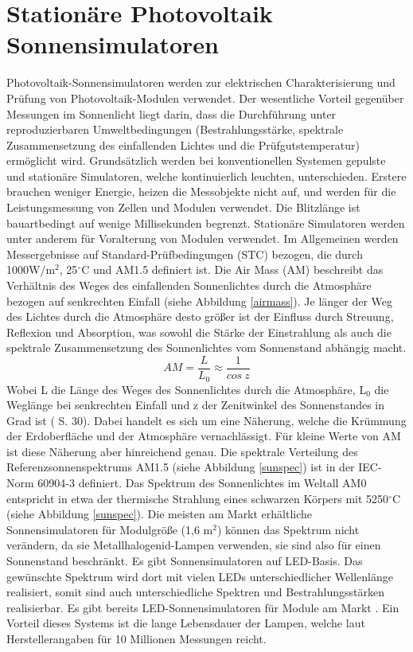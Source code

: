 \documentclass[a4paper,bibtotoc,oneside]{scrbook}
\begin{document}
\section{Stationäre Photovoltaik Sonnensimulatoren} \thispagestyle{empty}

Photovoltaik-Sonnensimulatoren werden zur elektrischen Charakterisierung und Prüfung von Photovoltaik-Modulen verwendet. Der wesentliche Vorteil gegenüber Messungen im Sonnenlicht liegt darin, dass die Durchführung unter reproduzierbaren Umweltbedingungen (Bestrahlungsstärke, spektrale Zusammensetzung des einfallenden Lichtes und die Prüfgutstemperatur)  ermöglicht wird. Grundsätzlich werden bei konventionellen Systemen gepulste und stationäre Simulatoren, welche kontinuierlich leuchten, unterschieden. Erstere brauchen weniger Energie, heizen die Messobjekte nicht auf, und werden für die Leistungsmessung von Zellen und Modulen verwendet. Die Blitzlänge ist bauartbedingt auf wenige Millisekunden begrenzt. Stationäre Simulatoren werden unter anderem für Voralterung von Modulen verwendet.
Im Allgemeinen werden Messergebnisse auf Standard-Prüfbedingungen (STC) bezogen, die durch 1000W/m$^2$, 25$^{\circ}$C und AM1.5 definiert ist. Die Air Mass (AM) beschreibt das Verhältnis des Weges des einfallenden Sonnenlichtes durch die Atmosphäre bezogen auf senkrechten Einfall (siehe Abbildung \ref{airmass}). Je länger der Weg des Lichtes durch die Atmosphäre desto größer ist der Einfluss durch Streuung, Reflexion und Absorption, was sowohl die Stärke der Einstrahlung als auch die spektrale Zusammensetzung des Sonnenlichtes vom Sonnenstand abhängig macht. 
\begin{equation}
     AM = \frac {L} {L_0} \approx \frac{1}{cos~ z}
\end{equation}
Wobei L die Länge des Weges des Sonnenlichtes durch die Atmosphäre, L$_0$ die Weglänge bei senkrechten Einfall und z der Zenitwinkel des Sonnenstandes in Grad ist (\cite{wurf} S. 30). Dabei handelt es sich um eine Näherung, welche die Krümmung der Erdoberfläche und der Atmosphäre vernachlässigt. Für kleine Werte von AM ist diese Näherung aber hinreichend genau.
Die spektrale Verteilung des Referenzsonnenspektrums AM1.5 (siehe Abbildung \ref{sunspec}) ist in der IEC-Norm 60904-3 \cite{norm3} definiert. Das Spektrum des Sonnenlichtes im Weltall AM0 entspricht in etwa der thermische Strahlung eines schwarzen Körpers mit 5250$^\circ$C (siehe Abbildung \ref{sunspec}).
Die meisten am Markt erhältliche Sonnensimulatoren für Modulgröße (1,6 m$^2$) können das Spektrum nicht verändern, da sie Metallhalogenid-Lampen verwenden, sie sind also für einen Sonnenstand beschränkt. Es gibt Sonnensimulatoren auf LED-Basis. Das gewünschte Spektrum wird dort mit vielen LEDs unterschiedlicher Wellenlänge realisiert, somit sind auch unterschiedliche Spektren und Bestrahlungsstärken realisierbar. Es gibt bereits LED-Sonnensimulatoren für Module am Markt \cite{mps}. Ein Vorteil dieses Systems ist die lange Lebensdauer der Lampen, welche laut Herstellerangaben für 10 Millionen Messungen reicht. 
\end{document}
